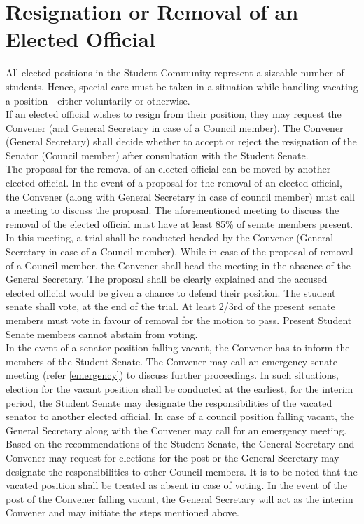 \documentclass[12pt]{article}
\begin{document}
\section{Resignation or Removal of an Elected Official}
All elected positions in the Student Community represent a sizeable number of students. Hence, special care must be taken in a situation while handling vacating a position - either voluntarily or otherwise.\\

\noindent If an elected official wishes to resign from their position, they may request  the Convener (and General Secretary in case of a Council member). The Convener (General Secretary) shall decide whether to accept or reject the resignation of the Senator (Council member) after consultation with the Student Senate. \\

\noindent The proposal for the removal of an elected official can be moved by another elected official. In the event of a proposal for the removal of an elected official, the Convener (along with General Secretary in case of council member) must call a meeting to discuss the proposal. The aforementioned meeting to discuss the removal of the elected official must have at least 85\% of senate members present. In this meeting, a trial shall be conducted headed by the Convener (General Secretary in case of a Council member). While in case of the proposal of removal of a Council member, the Convener shall head the meeting in the absence of the General Secretary. The proposal shall be clearly explained and the accused elected official would be given a chance to defend their position. The student senate shall vote, at the end of the trial. At least 2/3rd of the present senate members must vote in favour of removal for the motion to pass. Present Student Senate members cannot abstain from voting. \\

\noindent In the event of a senator position falling vacant, the Convener has to inform the members of the Student Senate. The Convener may call an emergency senate meeting (refer \ref{emergency}) to discuss further proceedings. In such situations, election for the vacant position shall be conducted at the earliest, for the interim period, the Student Senate may designate the responsibilities of the vacated senator to another elected official. In case of a council position falling vacant, the General Secretary along with the Convener may call for an emergency meeting. Based on the recommendations of the Student Senate, the General Secretary and Convener may request for elections for the post or the General Secretary may designate the responsibilities to other Council members. It is to be noted that the vacated position shall be treated as absent in case of voting. In the event of the post of the Convener falling vacant, the General Secretary will act as the interim Convener and may initiate the steps mentioned above. \\
\end{document}
